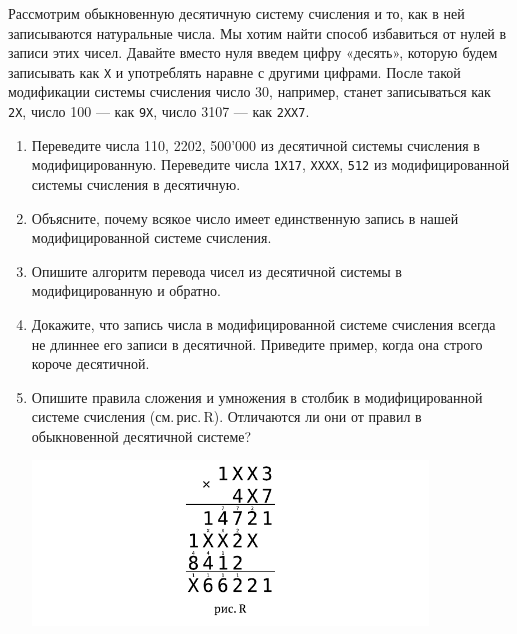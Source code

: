 ﻿


\ms Рассмотрим обыкновенную десятичную систему счисления и то, как в ней записываются натуральные числа. Мы хотим найти способ избавиться от нулей в записи этих чисел. Давайте вместо нуля введем цифру «десять», которую будем записывать как {\verb!X!} и употреблять наравне с другими цифрами. После такой модификации системы счисления число 30, например, станет записываться как {\verb!2X!}, число 100 — как {\verb!9X!}, число 3107 — как {\verb!2XX7!}.

\begin{enumerate}

\item Переведите числа 110, 2202, 500'000 из десятичной системы счисления в модифицированную. Переведите числа {\verb!1X17!}, {\verb!XXXX!}, {\verb!512!} из модифицированной системы счисления в десятичную.

\item Объясните, почему всякое число имеет единственную запись в нашей модифицированной системе счисления.

\item Опишите алгоритм перевода чисел из десятичной системы в модифицированную и обратно.

\item Докажите, что запись числа в модифицированной системе счисления всегда не длиннее его записи в десятичной. Приведите пример, когда она строго короче десятичной.

\item Опишите правила сложения и умножения в столбик в модифицированной системе счисления (см.\,рис.\,R). Отличаются ли они от правил в обыкновенной десятичной системе?

\vspace{-0.3cm}
\begin{center}
\includegraphics[width=10.5cm]{stats/2017/images/stolbik.pdf}
\end{center} \vspace{-0.7cm}


\end{enumerate}
